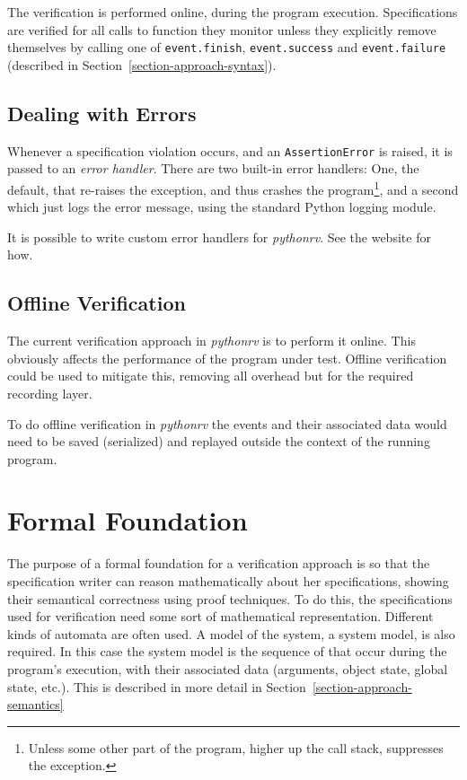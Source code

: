 \documentclass[a4paper,11pt]{kth-mag}
\theoremstyle{definition}
\begin{document}
The verification is performed online, during the program execution.
Specifications are verified for all calls to function they monitor unless they
explicitly remove themselves by calling one of \texttt{event.finish},
\texttt{event.success} and \texttt{event.failure} (described in
Section~\ref{section-approach-syntax}).


\subsection{Dealing with Errors}

Whenever a specification violation occurs, and an \texttt{AssertionError} is
raised, it is passed to an \textit{error handler}. There are two built-in error
handlers: One, the default, that re-raises the exception, and thus crashes the
program\footnote{Unless some other part of the program, higher up the call
stack, suppresses the exception.}, and a second which just logs the error
message, using the standard Python logging module.

It is possible to write custom error handlers for \textit{pythonrv}. See the
website for how.


\subsection{Offline Verification}

The current verification approach in \textit{pythonrv} is to perform it online.
This obviously affects the performance of the program under test. Offline
verification could be used to mitigate this, removing all overhead but for the
required recording layer.

To do offline verification in \textit{pythonrv} the events and their associated
data would need to be saved (serialized) and replayed outside the context of
the running program.



\section{Formal Foundation} \label{section-approach-formal-foundation}

The purpose of a formal foundation for a verification approach is so that the
specification writer can reason mathematically about her specifications,
showing their semantical correctness using proof techniques. To do this, the
specifications used for verification need some sort of mathematical
representation. Different kinds of automata are often used. A model of the
system, a system model, is also required. In this case the system model is the
sequence of that occur during the program's execution, with their associated
data (arguments, object state, global state, etc.). This is described in more
detail in Section~\ref{section-approach-semantics}
\end{document}

